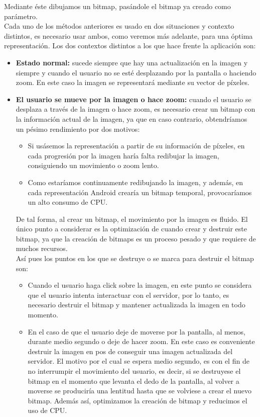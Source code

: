 Mediante éste dibujamos un bitmap, pasándole el bitmap ya creado como parámetro.\\

Cada uno de los métodos anteriores es usado en dos situaciones y contexto distintos, es necesario usar ambos, como veremos más adelante, para una óptima representación. Los dos contextos distintos a los que hace frente la aplicación son:\\

\begin{itemize}
\item \textbf{Estado normal:} sucede siempre que hay una actualización en la imagen y siempre y cuando el usuario no se esté desplazando por la pantalla o haciendo zoom. En este caso la imagen se representará mediante su vector de píxeles.

\item \textbf{El usuario se mueve por la imagen o hace zoom:} cuando el usuario se desplaza a través de la imagen o hace zoom, es necesario crear un bitmap con la información actual de la imagen, ya que en caso contrario, obtendríamos un pésimo rendimiento por dos motivos:

\begin{itemize}
\item Si usásemos la representación a partir de su información de píxeles, en cada progresión por la imagen haría falta redibujar la imagen, consiguiendo un movimiento o zoom lento.
\item Como estaríamos continuamente redibujando la imagen, y además, en cada representación Android crearía un bitmap temporal,     provocaríamos un alto consumo de CPU.
\end{itemize}

De tal forma, al crear un bitmap, el movimiento por la imagen es fluido. El único punto a considerar es la optimización de cuando crear y destruir este bitmap, ya que la creación de bitmaps es un proceso pesado y que requiere de muchos recursos.\\

Así pues los puntos en los que se destruye o se marca para destruir el bitmap son:

\begin{itemize}
\item Cuando el usuario haga click sobre la imagen, en este punto se considera que el usuario intenta interactuar con el servidor, por lo tanto, es necesario destruir el bitmap y mantener actualizada la imagen en todo momento.
\item En el caso de que el usuario deje de moverse por la pantalla, al menos, durante medio segundo o deje de hacer zoom. En este caso es conveniente destruir la imagen en pos de conseguir una imagen actualizada del servidor. El motivo por el cual se espera medio segundo, es con el fin de no interrumpir el movimiento del usuario, es decir, si se destruyese el bitmap en el momento que levanta el dedo de la pantalla, al volver a moverse se produciría una lentitud hasta que se volviese a crear el nuevo bitmap. Además así, optimizamos la creación de bitmap y reducimos el uso de CPU.
\end{itemize}

\end{itemize}

